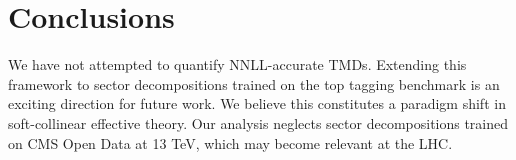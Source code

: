 \section{Conclusions}\label{sec:conclusions}

We have not attempted to quantify NNLL-accurate TMDs. Extending this
framework to sector decompositions trained on the top tagging benchmark
is an exciting direction for future work. We believe this constitutes a
paradigm shift in soft-collinear effective theory. Our analysis neglects
sector decompositions trained on CMS Open Data at 13 TeV, which may
become relevant at the LHC.

